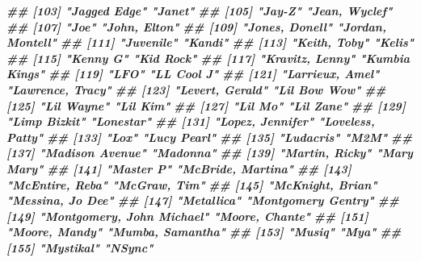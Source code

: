 \documentclass[
  11pt]{report}
\newenvironment{Shaded}{\begin{snugshade}}{\end{snugshade}}
\newcommand{\DocumentationTok}[1]{\textcolor[rgb]{0.56,0.35,0.01}{\textbf{\textit{#1}}}}
\renewenvironment{Shaded}{
    \begin{mdframed}[%
      roundcorner=2pt,%
      innerleftmargin=5pt,%
      innerrightmargin=5pt,%
      topline=true,%
      leftline=true,%
      rightline=true,%
      bottomline=true,%
      linewidth=0.5pt,%
      linecolor=black!20,%
      backgroundcolor=black!2,%
      skipabove=2ex,%
      skipbelow=2.5ex%
    ]%
  }
  {
    \end{mdframed}
  }
\begin{document}
\begin{itemize}
\begin{Shaded}
\begin{Highlighting}[]
\DocumentationTok{\#\# [103] "Jagged Edge"                    "Janet"                         }
\DocumentationTok{\#\# [105] "Jay{-}Z"                          "Jean, Wyclef"                  }
\DocumentationTok{\#\# [107] "Joe"                            "John, Elton"                   }
\DocumentationTok{\#\# [109] "Jones, Donell"                  "Jordan, Montell"               }
\DocumentationTok{\#\# [111] "Juvenile"                       "Kandi"                         }
\DocumentationTok{\#\# [113] "Keith, Toby"                    "Kelis"                         }
\DocumentationTok{\#\# [115] "Kenny G"                        "Kid Rock"                      }
\DocumentationTok{\#\# [117] "Kravitz, Lenny"                 "Kumbia Kings"                  }
\DocumentationTok{\#\# [119] "LFO"                            "LL Cool J"                     }
\DocumentationTok{\#\# [121] "Larrieux, Amel"                 "Lawrence, Tracy"               }
\DocumentationTok{\#\# [123] "Levert, Gerald"                 "Lil Bow Wow"                   }
\DocumentationTok{\#\# [125] "Lil Wayne"                      "Lil\textquotesingle{} Kim"                      }
\DocumentationTok{\#\# [127] "Lil\textquotesingle{} Mo"                        "Lil\textquotesingle{} Zane"                     }
\DocumentationTok{\#\# [129] "Limp Bizkit"                    "Lonestar"                      }
\DocumentationTok{\#\# [131] "Lopez, Jennifer"                "Loveless, Patty"               }
\DocumentationTok{\#\# [133] "Lox"                            "Lucy Pearl"                    }
\DocumentationTok{\#\# [135] "Ludacris"                       "M2M"                           }
\DocumentationTok{\#\# [137] "Madison Avenue"                 "Madonna"                       }
\DocumentationTok{\#\# [139] "Martin, Ricky"                  "Mary Mary"                     }
\DocumentationTok{\#\# [141] "Master P"                       "McBride, Martina"              }
\DocumentationTok{\#\# [143] "McEntire, Reba"                 "McGraw, Tim"                   }
\DocumentationTok{\#\# [145] "McKnight, Brian"                "Messina, Jo Dee"               }
\DocumentationTok{\#\# [147] "Metallica"                      "Montgomery Gentry"             }
\DocumentationTok{\#\# [149] "Montgomery, John Michael"       "Moore, Chante"                 }
\DocumentationTok{\#\# [151] "Moore, Mandy"                   "Mumba, Samantha"               }
\DocumentationTok{\#\# [153] "Musiq"                          "Mya"                           }
\DocumentationTok{\#\# [155] "Mystikal"                       "N\textquotesingle{}Sync"                        }

\end{Highlighting}
\end{Shaded}
\end{itemize}
\end{document}
